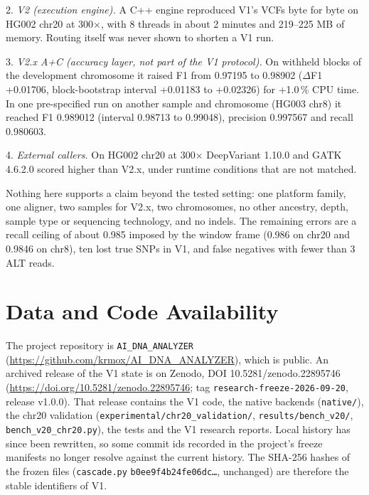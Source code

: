 \documentclass[11pt,a4paper]{article}
\makeatletter
\newcommand{\needspace}[1]{\par\ifdim\pagegoal=\maxdimen\else\dimen@=\pagegoal\advance\dimen@-\pagetotal\ifdim\dimen@<#1\relax\newpage\fi\fi}
\makeatother
\begin{document}
2. \emph{V2 (execution engine).} A C++ engine reproduced V1's VCFs byte for byte on HG002 chr20 at 300$\times$, with 8 threads in about 2 minutes and 219--225 MB of memory. Routing itself was never shown to shorten a V1 run.

3. \emph{V2.x A+C (accuracy layer, not part of the V1 protocol).} On withheld blocks of the development chromosome it raised F1 from 0.97195 to 0.98902 ($\Delta$F1 +0.01706, block-bootstrap interval +0.01183 to +0.02326) for +1.0\,\% CPU time. In one pre-specified run on another sample and chromosome (HG003 chr8) it reached F1 0.989012 (interval 0.98713 to 0.99048), precision 0.997567 and recall 0.980603.

4. \emph{External callers.} On HG002 chr20 at 300$\times$ DeepVariant 1.10.0 and GATK 4.6.2.0 scored higher than V2.x, under runtime conditions that are not matched.

Nothing here supports a claim beyond the tested setting: one platform family, one aligner, two samples for V2.x, two chromosomes, no other ancestry, depth, sample type or sequencing technology, and no indels. The remaining errors are a recall ceiling of about 0.985 imposed by the window frame (0.986 on chr20 and 0.9846 on chr8), ten lost true SNPs in V1, and false negatives with fewer than 3 ALT reads.

\FloatBarrier
\needspace{10\baselineskip}
\section*{\texorpdfstring{Data and Code Availability}{Data and Code Availability}}
The project repository is \texttt{AI\_\allowbreak{}DNA\_\allowbreak{}ANALYZER} (\url{https://github.com/krmox/AI_DNA_ANALYZER}), which is public. An archived release of the V1 state is on Zenodo, DOI 10.5281/zenodo.22895746 (\url{https://doi.org/10.5281/zenodo.22895746}; tag \texttt{research-freeze-2026-09-20}, release v1.0.0). That release contains the V1 code, the native backends (\texttt{native/\allowbreak{}}), the chr20 validation (\texttt{experimental/\allowbreak{}chr20\_\allowbreak{}validation/\allowbreak{}}, \texttt{results/\allowbreak{}bench\_\allowbreak{}v20/\allowbreak{}}, \texttt{bench\_\allowbreak{}v20\_\allowbreak{}chr20.\allowbreak{}py}), the tests and the V1 research reports. Local history has since been rewritten, so some commit ids recorded in the project's freeze manifests no longer resolve against the current history. The SHA-256 hashes of the frozen files (\texttt{cascade.\allowbreak{}py} \texttt{b0ee9f4b\allowbreak{}24fe06dc\ldots{}}, unchanged) are therefore the stable identifiers of V1.
\end{document}
